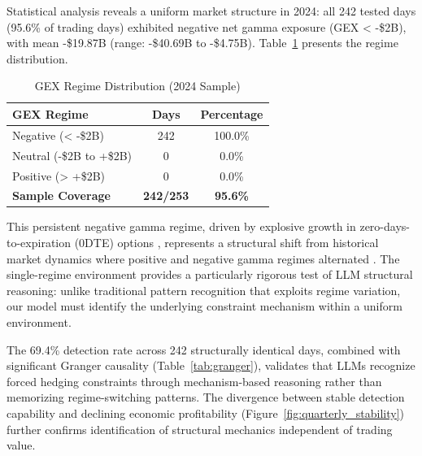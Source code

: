 Statistical analysis reveals a uniform market structure in 2024: all 242 tested days (95.6\% of trading days) exhibited negative net gamma exposure (GEX < -\$2B), with mean -\$19.87B (range: -\$40.69B to -\$4.75B). Table~\ref{tab:gex_regime} presents the regime distribution.

\begin{table}[htbp]
\centering
\caption{GEX Regime Distribution (2024 Sample)}
\label{tab:gex_regime}
\begin{tabular}{lcc}
\toprule
GEX Regime & Days & Percentage \\
\midrule
Negative (< -\$2B) & 242 & 100.0\% \\
Neutral (-\$2B to +\$2B) & 0 & 0.0\% \\
Positive (> +\$2B) & 0 & 0.0\% \\
\midrule
\textbf{Sample Coverage} & \textbf{242/253} & \textbf{95.6\%} \\
\bottomrule
\end{tabular}
\end{table}

This persistent negative gamma regime, driven by explosive growth in zero-days-to-expiration (0DTE) options \cite{cboe2023,jpmorgan2023}, represents a structural shift from historical market dynamics where positive and negative gamma regimes alternated \cite{ni2005stock,garleanu2009demand}. The single-regime environment provides a particularly rigorous test of LLM structural reasoning: unlike traditional pattern recognition that exploits regime variation, our model must identify the underlying constraint mechanism within a uniform environment.

The 69.4\% detection rate across 242 structurally identical days, combined with significant Granger causality (Table~\ref{tab:granger}), validates that LLMs recognize forced hedging constraints through mechanism-based reasoning rather than memorizing regime-switching patterns. The divergence between stable detection capability and declining economic profitability (Figure~\ref{fig:quarterly_stability}) further confirms identification of structural mechanics independent of trading value.
